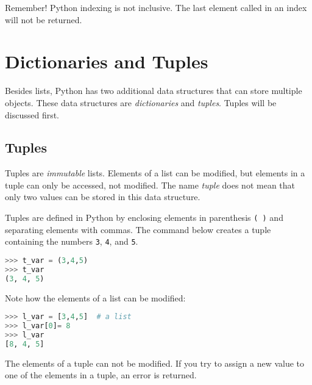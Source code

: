 \documentclass{book}
\newcommand{\passthrough}[1]{#1}
\begin{document}
    
        Remember! Python indexing is not inclusive. The last element called in
an index will not be returned.
    




    
        \hypertarget{dictionaries-and-tuples}{%
\section{Dictionaries and Tuples}\label{dictionaries-and-tuples}}
    




    
        Besides lists, Python has two additional data structures that can store
multiple objects. These data structures are \emph{dictionaries} and
\emph{tuples}. Tuples will be discussed first.
    




    
        \hypertarget{tuples}{%
\subsection{Tuples}\label{tuples}}
    




    
        Tuples are \emph{immutable} lists. Elements of a list can be modified,
but elements in a tuple can only be accessed, not modified. The name
\emph{tuple} does not mean that only two values can be stored in this
data structure.

Tuples are defined in Python by enclosing elements in parenthesis
\passthrough{\lstinline!( )!} and separating elements with commas. The
command below creates a tuple containing the numbers
\passthrough{\lstinline!3!}, \passthrough{\lstinline!4!}, and
\passthrough{\lstinline!5!}.

\begin{lstlisting}[language=Python]
>>> t_var = (3,4,5)
>>> t_var
(3, 4, 5)
\end{lstlisting}

Note how the elements of a list can be modified:

\begin{lstlisting}[language=Python]
>>> l_var = [3,4,5]  # a list
>>> l_var[0]= 8
>>> l_var
[8, 4, 5]
\end{lstlisting}

The elements of a tuple can not be modified. If you try to assign a new
value to one of the elements in a tuple, an error is returned.
\end{document}
